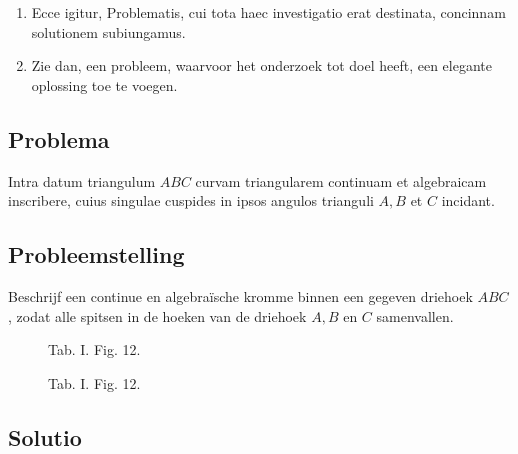 \documentclass[10pt,a4paper]{article}
\newcommand{\switchenum}{\setcounter{enumi}{\arabic{enumi}-1}\switchcolumn}
\begin{document}
\begin{paracol}{2}
\begin{enumerate}[topsep=1px]
		\switchcolumn*
		
		\item Ecce igitur, Problematis, cui tota haec investigatio erat destinata, concinnam solutionem subiungamus.
		
		\switchenum
		\item Zie dan, een probleem, waarvoor het onderzoek tot doel heeft, een elegante oplossing toe te voegen.
		\switchcolumn*
	\end{enumerate}		


	\subsection*{Problema}
	\par Intra datum triangulum $A B C$ curvam triangularem continuam et algebraicam inscribere, cuius singulae cuspides in ipsos angulos trianguli $A, B$ et $C$ incidant.
	
	\switchcolumn
	\subsection*{Probleemstelling}
	
	\par Beschrijf een continue en algebraïsche kromme binnen een gegeven driehoek $ABC$, zodat alle spitsen in de hoeken van de driehoek $A,B$ en $C$ samenvallen.
	
	\switchcolumn*
	
	\begin{figure}[h]
		\centering
		\par {
			\selectfont
			\begin{tikzpicture}[rotate=180, scale=1]
			
			\end{tikzpicture}}
		\selectfont
		\caption{Tab. I. Fig. 12.}
	\end{figure}
	\switchcolumn
	\begin{figure}[h]
		\centering
		\par {
			\selectfont
			\begin{tikzpicture}[rotate=180, scale=1]
			
			\end{tikzpicture}}
		\selectfont
		\caption{Tab. I. Fig. 12.}
	\end{figure}
	
	\switchcolumn*
	
	\subsection*{Solutio}
	

\end{paracol}
\end{document}
